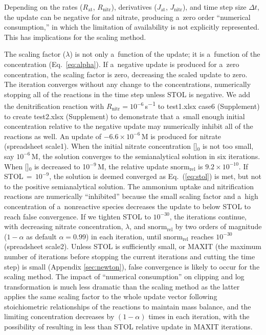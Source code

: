 \documentclass[gmdd, online, hvmath]{copernicus}
\begin{document}
      Depending on the rates ($R_{\text{at}}$, $R_{\text{nitr}}$),
      derivatives ($J_{\text{at}}$, $J_{\text{nitr}}$), and time step size
      $\Delta t$, the update can be negative for  and nitrate,
      producing a~zero order ``numerical consumption,'' in which the
      limitation of availability is not explicitly represented. This has
      implications for the scaling method.

      The scaling factor ($\lambda$) is not only a~function of the update;
      it is a~function of the concentration (Eq.~\ref{eq:alpha}). If
      a~negative update is produced for a~zero concentration, the scaling
      factor is zero, decreasing the scaled update to zero. The iteration
      converges without any change to the concentrations, numerically
      stopping all of the reactions in the time step unless STOL is
      negative. We add the denitrification reaction with $R_{\text{nitr}} =
      10^{-6}$\,\unit{s^{-1}} to  test1.xlsx case6 (Supplement) to create  test2.xlsx
      (Supplement)
      to demonstrate that a~small enough initial concentration relative to
      the negative update may numerically inhibit all of the reactions as
      well.  An update of $-6.6 \times 10^{-6}$\,\unit{M} is produced for
      nitrate (spreadsheet scale1). When the initial nitrate concentration
      []$_0$ is not too small, say $10^{-6}$\,\unit{M}, the
      solution converges to the semianalytical solution in six
      iterations. When []$_0$ is decreased to
      10$^{-9}$\,\unit{M}, the relative update $\text{snorm}_{\text{rel}}$
      is $9.2\times 10^{-10}$. If STOL\,$=$\,$10^{-9}$, the solution is
      deemed converged as Eq.~(\ref{eq:stol}) is met, but not to the
      positive semianalytical solution. The ammonium uptake and
      nitrification reactions are numerically ``inhibited'' because the
      small scaling factor and a~high concentration of a~nonreactive species
      decreases the update to below STOL to reach false convergence. If we
      tighten STOL to $10^{-30}$, the iterations continue, with decreasing
      nitrate concentration, $\lambda$, and $\text{snorm}_{\text{rel}}$ by
      two orders of magnitude ($1-\alpha$ as default $\alpha=0.99$) in each
      iteration, until $\text{snorm}_{\text{rel}}$ reaches $10^{-30}$
      (spreadsheet scale2). Unless STOL is sufficiently small, or MAXIT (the
      maximum number of iterations before stopping the current iterations
      and cutting the time step) is small (Appendix \ref{sec:newton}), false
      convergence is likely to occur for the scaling method. The impact of
      ``numerical consumption'' on clipping and log transformation is much
      less dramatic than the scaling method as the latter applies the same
      scaling factor to the whole update vector following stoichiometric
      relationships of the reactions to maintain mass balance, and the
      limiting concentration decreases by $(1-\alpha)$ times in each
      iteration, with the possibility of resulting in less than STOL
      relative update in MAXIT iterations.
\end{document}
